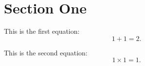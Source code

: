 \documentclass{article}
\begin{document}
\section{Section One}
\label{sec:section_1}

This is the first equation:
\begin{equation}
1 + 1 = 2.
\label{eq:1}
\end{equation}

This is the second equation:
\begin{equation}
1 \times 1 = 1.
\label{eq:2}
\end{equation}
\end{document}
